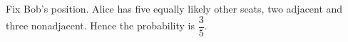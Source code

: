 Fix Bob's position. Alice has five equally likely other seats, two adjacent and three nonadjacent. Hence the probability is $\boxed{\dfrac{3}{5}}$.
